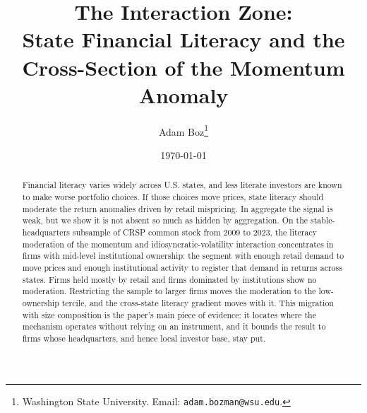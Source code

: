 \documentclass[12pt]{article}
\title{The Interaction Zone:\\
State Financial Literacy and the\\
Cross-Section of the Momentum Anomaly}
\author{Adam Boz\thanks{Washington State University. Email: \texttt{adam.bozman@wsu.edu}.}}
\date{\today}
\begin{document}
\maketitle

\begin{abstract}
\noindent
Financial literacy varies widely across U.S. states, and less literate investors are known to make worse portfolio choices. If those choices move prices, state literacy should moderate the return anomalies driven by retail mispricing. In aggregate the signal is weak, but we show it is not absent so much as hidden by aggregation. On the stable-headquarters subsample of CRSP common stock from 2009 to 2023, the literacy moderation of the momentum and idiosyncratic-volatility interaction concentrates in firms with mid-level institutional ownership: the segment with enough retail demand to move prices and enough institutional activity to register that demand in returns across states. Firms held mostly by retail and firms dominated by institutions show no moderation. Restricting the sample to larger firms moves the moderation to the low-ownership tercile, and the cross-state literacy gradient moves with it. This migration with size composition is the paper's main piece of evidence: it locates where the mechanism operates without relying on an instrument, and it bounds the result to firms whose headquarters, and hence local investor base, stay put.
\end{abstract}












\end{document}
